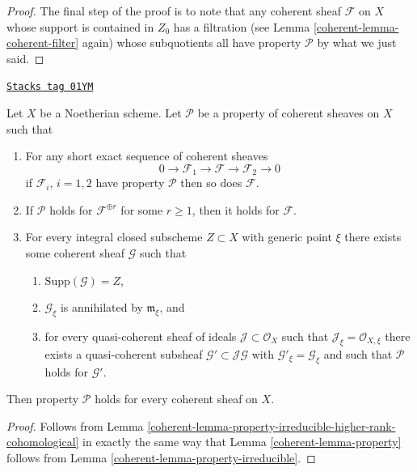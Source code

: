 \begin{proof}
\medskip\noindent
The final step of the proof is to note that any coherent sheaf
$\mathcal{F}$ on $X$ whose support is contained in $Z_0$ has a filtration
(see Lemma \ref{coherent-lemma-coherent-filter} again) whose subquotients
all have property $\mathcal{P}$ by what we just said.
\end{proof}

\begin{lemma}
\label{coherent-lemma-property-higher-rank-cohomological}
\href{https://stacks.math.columbia.edu/tag/01YM}{\texttt{Stacks tag 01YM}}

Let $X$ be a Noetherian scheme.
Let $\mathcal{P}$ be a property of coherent sheaves on $X$ such that
\begin{enumerate}
\item For any short exact sequence of coherent sheaves
$$
0 \to \mathcal{F}_1 \to \mathcal{F} \to \mathcal{F}_2 \to 0
$$
if $\mathcal{F}_i$, $i = 1, 2$ have property $\mathcal{P}$
then so does $\mathcal{F}$.
\item If $\mathcal{P}$ holds  for $\mathcal{F}^{\oplus r}$ for
some $r \geq 1$, then it holds for $\mathcal{F}$.
\item For every integral closed subscheme $Z \subset X$
with generic point $\xi$ there exists
some coherent sheaf $\mathcal{G}$ such that
\begin{enumerate}
\item $\text{Supp}(\mathcal{G}) = Z$,
\item $\mathcal{G}_\xi$ is annihilated by $\mathfrak m_\xi$, and
\item for every quasi-coherent sheaf of ideals
$\mathcal{J} \subset \mathcal{O}_X$ such that
$\mathcal{J}_\xi = \mathcal{O}_{X, \xi}$ there exists a quasi-coherent
subsheaf $\mathcal{G}' \subset \mathcal{J}\mathcal{G}$ with
$\mathcal{G}'_\xi = \mathcal{G}_\xi$ and such that
$\mathcal{P}$ holds for $\mathcal{G}'$.
\end{enumerate}
\end{enumerate}
Then property $\mathcal{P}$ holds for every coherent sheaf
on $X$.
\end{lemma}

\begin{proof}

Follows from Lemma \ref{coherent-lemma-property-irreducible-higher-rank-cohomological}
in exactly the same way that Lemma \ref{coherent-lemma-property} follows from
Lemma \ref{coherent-lemma-property-irreducible}.
\end{proof}

